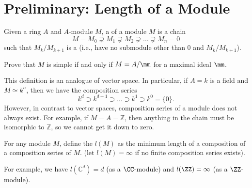 \section{Preliminary: Length of a Module}
\begin{definition}
    Given a ring $A$ and $A$-module $M$,
    a  of a module $M$
    is a chain
    $$M=M_0\supsetneq M_1\supsetneq M_2
    \supsetneq \dots\supsetneq M_n=0$$
    such that $M_k/M_{k+1}$ is a 
    (i.e., have no submodule other than $0$
    and $M_k/M_{k+1}$).
\end{definition}
\begin{exercise}
    Prove that $M$ is simple if and only if 
    $M=A/\mm$ for a maximal ideal $\mm$.
\end{exercise}
This definition is an analogue of vector space.
In particular, if $A=k$ is a field and $M\simeq k^n$,
then we have the composition series
$$k^d \supset k^{d-1}\supset\dots\supset k^1\supset k^0=\{0\}.$$
However, in contrast to vector spaces,
composition series of a module does not always exist.
For example, if $M=A=\mathbb Z$,
then anything in the chain must be isomorphic to $\mathbb Z$,
so we cannot get it down to zero.
\begin{definition}[Length]
    For any module $M$, define the
     $l(M)$ as the minimum length
    of a composition of a composition series of $M$.
    (let $l(M)=\infty$ if no finite composition series exists).
\end{definition}
For example, we have $l(\mathbb C^d) = d$
(as a $\CC$-module) and $l(\ZZ)=\infty$ 
(as a $\ZZ$-module).

